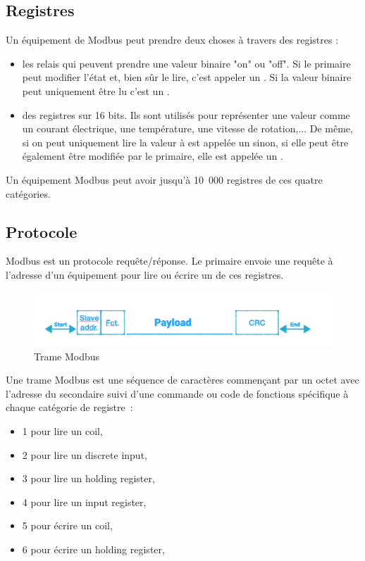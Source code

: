  \subsection{Registres}
 
 
 Un équipement de Modbus peut prendre deux choses à travers des registres : 
 \begin{itemize}
     \item les relais qui peuvent prendre une valeur binaire "on" ou "off". Si le primaire peut modifier l'état et, bien sûr le lire, c'est appeler un \textit{}. Si la valeur binaire peut uniquement être lu c'est un \textit{}.
     \item des registres sur 16 bits. Ils sont utilisés pour représenter une valeur comme un courant électrique, une température, une vitesse de rotation,... De même, si on peut uniquement lire la valeur à est appelée un \textit{} sinon, si elle peut être également être modifiée par le primaire, elle est appelée un \textit{}.
 \end{itemize}
 
    \vspace{1em}

 
Un équipement Modbus peut avoir jusqu'à 10~000 registres de ces quatre catégories. 

\subsection{Protocole}

Modbus est un protocole requête/réponse. Le primaire envoie une requête à l'adresse d'un équipement pour lire ou écrire un de ces registres. 
\begin{figure}[tbp]
\centerline{\includegraphics[width=1\columnwidth]{Pictures/Capture37.png}}
\caption{Trame Modbus}
\label{fig-modbus2}
\end{figure}

 

Une trame Modbus est une séquence de caractères commençant par un octet avec l'adresse du secondaire suivi d'une commande ou code de fonctions spécifique à chaque catégorie de registre~:
\begin{itemize}
    \item 1 pour lire un coil,
    \item 2 pour lire un discrete input,
    \item 3 pour lire un holding register,
    \item 4 pour lire un input register,
    \item 5 pour écrire un coil,
    \item 6 pour écrire un holding register,
\end{itemize}

